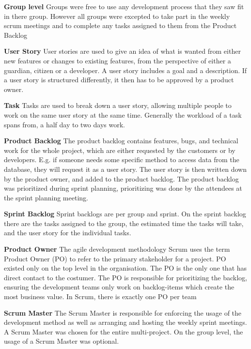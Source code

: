 \textbf{Group level}
Groups were free to use any development process that they saw fit in there group. However all groups were excepted to take part in the weekly scrum meetings and to complete any tasks assigned to them from the Product Backlog

\textbf{User Story}
User stories are used to give an idea of what is wanted from either new features or changes to existing features, from the perspective of either a guardian, citizen or a developer. A user story includes a goal and a description. If a user story is structured differently, it then has to be approved by a product owner. 

\textbf{Task}
Tasks are used to break down a user story, allowing multiple people to work on the same user story at the same time. Generally the workload of a task spans from, a half day to two days work. 

\textbf{Product Backlog}
The product backlog contains features, bugs, and technical work for the whole project, which are either requested by the customers or by developers. E.g. if someone needs some specific method to access data from the database, they will request it as a user story. The user story is then written down by the product owner, and added to the product backlog. The product backlog was prioritized during sprint planning, prioritizing was done by the attendees at the sprint planning meeting.

\textbf{Sprint Backlog}
Sprint backlogs are per group and sprint. On the sprint backlog there are the tasks assigned to the group, the estimated time the tasks will take, and the user story for the individual tasks.

\textbf{Product Owner}
The agile development methodology Scrum uses the term Product Owner (PO) to refer to the primary stakeholder for a project. PO existed only on the top level in the organisation. The PO is the only one that has direct contact to the costumer. The PO is responsible for prioritizing the backlog, ensuring the development teams only work on backlog-items which create the most business value. In Scrum, there is exactly one PO per team \cite{Scrum_PO} 

\textbf{Scrum Master}
The Scrum Master is responsible for enforcing the usage of the development method as well as arranging and hosting the weekly sprint meetings. A Scrum Master was chosen for the entire multi-project. On the group level, the usage of a Scrum Master was optional.

